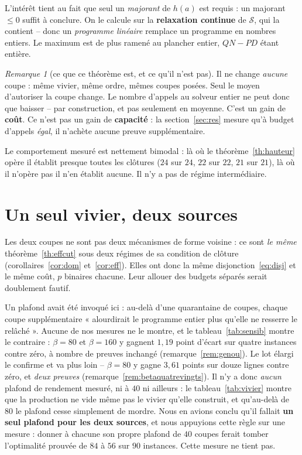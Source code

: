 \documentclass[11pt,a4paper]{article}
\theoremstyle{plain}
\theoremstyle{remark}
\newtheorem{remark}{Remarque}
\newcommand{\Scal}{\mathcal{S}}
\begin{document}
\noindent
L'intérêt tient au fait que seul un \emph{majorant} de $h(a)$ est requis :
un majorant $\le 0$ suffit à conclure. On le calcule sur la
\textbf{relaxation continue} de $\Scal$, qui la contient -- donc un
\emph{programme linéaire} remplace un programme en nombres entiers. Le
maximum est de plus ramené au plancher entier, $QN-PD$ étant entière.

\begin{remark}[ce que ce théorème est, et ce qu'il n'est pas]\label{rem:lemme}
Il ne change \emph{aucune} coupe : même vivier, même ordre, mêmes coupes
posées. Seul le moyen d'autoriser la coupe change. Le nombre d'appels au
solveur entier ne peut donc que baisser -- par construction, et pas
seulement en moyenne. C'est un gain de \textbf{coût}. Ce n'est pas un gain
de \textbf{capacité} : la section~\ref{sec:res} mesure qu'à budget d'appels
\emph{égal}, il n'achète aucune preuve supplémentaire.
\end{remark}

\noindent
Le comportement mesuré est nettement bimodal : là où le théorème~\ref{th:hauteur}
opère il
établit presque toutes les clôtures ($24$ sur $24$, $22$ sur $22$, $21$ sur
$21$), là où il n'opère pas il n'en établit aucune. Il n'y a pas de régime
intermédiaire.

\section{Un seul vivier, deux sources}
\label{sec:vivier}

Les deux coupes ne sont pas deux mécanismes de forme voisine : ce sont
\emph{le même} théorème~\ref{th:effcut} sous deux régimes de sa condition de
clôture (corollaires~\ref{cor:dom} et~\ref{cor:eff}). Elles ont donc la même
disjonction~\eqref{eq:disj} et le même coût, $p$ binaires chacune. Leur allouer des
budgets séparés serait doublement fautif.

Un plafond avait été invoqué ici : au-delà d'une quarantaine de coupes,
chaque coupe supplémentaire « alourdirait le programme entier plus qu'elle
ne resserre le relâché ». Aucune de nos mesures ne le montre, et le
tableau~\ref{tab:sensib} montre le contraire : $\beta=80$ et $\beta=160$
y gagnent $1{,}19$ point d'écart sur quatre instances contre zéro, à
nombre de preuves inchangé (remarque~\ref{rem:genou}). Le lot élargi le
confirme et va plus loin -- $\beta=80$ y gagne $3{,}61$ points sur douze
lignes contre zéro, et \emph{deux preuves}
(remarque~\ref{rem:betaquatrevingts}). Il n'y a donc \emph{aucun} plafond
de rendement mesuré, ni à $40$ ni ailleurs : le tableau~\ref{tab:vivier}
montre que la production ne vide même pas le vivier qu'elle construit, et
qu'au-delà de $80$ le plafond cesse simplement de mordre. Nous en
avions conclu
qu'il fallait \textbf{un seul plafond pour les deux sources}, et nous
appuyions cette règle sur une mesure : donner à chacune son propre plafond
de $40$ coupes ferait tomber l'optimalité prouvée de $84$ à $56$ sur $90$
instances. Cette mesure ne tient pas.
\end{document}
